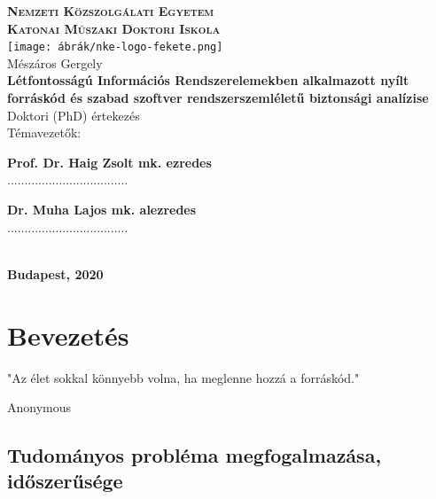 \documentclass[12pt,magyar,a4paper,oneside]{scrreprt}
\begin{document}
\begin{titlepage}
	\begin{center}
		\singlespacing
		\textsc{\Large
			\textbf{Nemzeti Közszolgálati Egyetem}\\[0.2cm]
			\textbf{Katonai Műszaki Doktori Iskola}
		}\\[1.3cm]
		\texttt{[image: ábrák/nke-logo-fekete.png]}\\[1.8cm]
		{\large Mészáros Gergely}\\[0.8cm]
		\Huge{}\textbf{Létfontosságú Információs
Rendszerelemekben alkalmazott nyílt forráskód és szabad szoftver
rendszerszemléletű biztonsági analízise}\\[1cm]
		\large Doktori (PhD) értekezés\\[3cm]
		Témavezetők:\\[0.8cm]
			\begin{minipage}{0.42\textwidth}
			\begin{center}
			\textbf{Prof. Dr. Haig Zsolt mk. ezredes}\\[2cm]
			...................................
			\end{center}
			\end{minipage}
			\hfill
			\begin{minipage}{0.42\textwidth}
			\begin{center}
			\textbf{Dr. Muha Lajos mk. alezredes}\\[2cm]
			...................................
			\end{center}
			\end{minipage}
		\hfill\\
	
		\vspace{1cm}
		\vfill
		\textbf{Budapest, 2020}
	\end{center}
\end{titlepage}

{
\setcounter{tocdepth}{4}
\tableofcontents
}

\hypertarget{sec:BEVEZETES}{%
\chapter{Bevezetés}\label{sec:BEVEZETES}}

\epigraph{"Az élet sokkal könnyebb volna, ha meglenne hozzá a forráskód."}{Anonymous}

\hypertarget{tudomuxe1nyos-probluxe9ma-megfogalmazuxe1sa-idux151szerux171suxe9ge}{%
\section{Tudományos probléma megfogalmazása,
időszerűsége}\label{tudomuxe1nyos-probluxe9ma-megfogalmazuxe1sa-idux151szerux171suxe9ge}}
\end{document}

